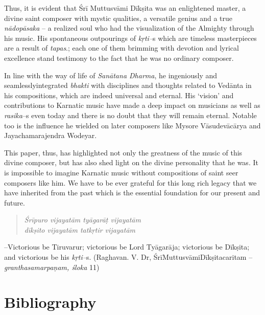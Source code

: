 Thus, it is evident that Śrī Muttusvāmi Dīkṣita was an enlightened master, a divine saint composer with mystic qualities, a versatile genius and a true \textit{nādopāsaka} – a realized soul who had the visualization of the Almighty through his music. His spontaneous outpourings of \textit{kṛti–}s which are timeless masterpieces are a result of \textit{tapas}.; each one of them brimming with devotion and lyrical excellence stand testimony to the fact that he was no ordinary composer.

In line with the way of life of \textit{Sanātana Dharma}, he ingeniously and seamlesslyintegrated \textit{bhakti} with disciplines and thoughts related to Vedānta in his compositions, which are indeed universal and eternal. His ‘vision’ and contributions to Karnatic music have made a deep impact on musicians as well as \textit{rasika}–s even today and there is no doubt that they will remain eternal. Notable too is the influence he wielded on later composers like Mysore Vāsudevācārya and Jayachamarajendra Wodeyar.

This paper, thus, has highlighted not only the greatness of the music of this divine composer, but has also shed light on the divine personality that he was. It is impossible to imagine Karnatic music without compositions of saint seer composers like him. We have to be ever grateful for this long rich legacy that we have inherited from the past which is the essential foundation for our present and future.

\vspace{-.3cm}

\begin{verse}
\textit{Śrīpuro vijayatām tyāgarāṭ vijayatām} \\\textit{dīkṣito vijayatām tatkṛtir vijayatām} 
\end{verse}

\vspace{-.3cm}

–Victorious be Tiruvarur; victorious be Lord Tyāgarāja; victorious be Dīkṣita; and victorious be his \textit{kṛti–}s. (Raghavan. V. Dr, ŚrīMuttusvāmiDīkṣitacaritam – \textit{granthasamarpaṇam, śloka} 11)

\section*{Bibliography}

